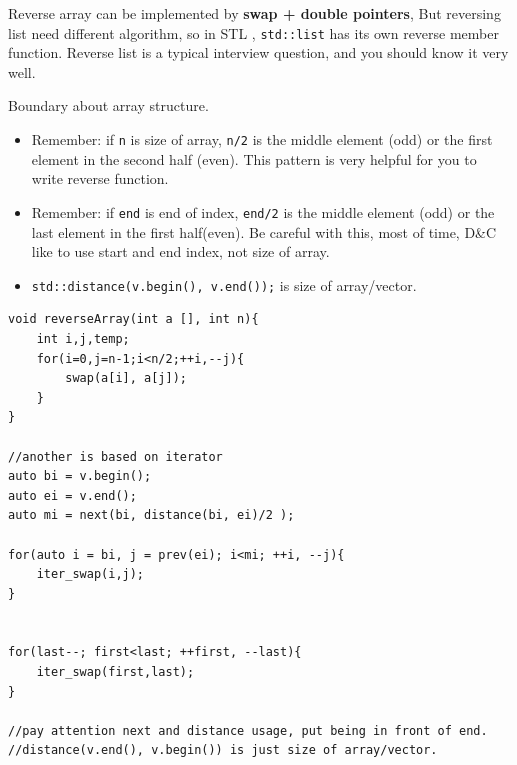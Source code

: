\documentclass[a4paper,11pt,twoside]{book}
\begin{document}
	
	\par  Reverse array can be implemented by \textbf{swap + double pointers}, But reversing list need different algorithm, so in STL , \texttt{std::list} has its own reverse member function. Reverse list is a typical interview question, and you should know it very well. 
	
	\par Boundary about array structure. 
	\begin{itemize}
		\item Remember: if \texttt{n} is size of array, \texttt{n/2} is the middle element (odd) or the first element in the second half (even). This pattern is very helpful for you to write reverse function. 
		
		\item Remember: if \texttt{end} is end of index, \texttt{end/2} is the middle element (odd) or the last element in the first half(even). Be careful with this, most of time, D\&C like to use start and end index, not size of array. 
		
		\item \texttt{std::distance(v.begin(), v.end());} is size of array/vector. 
	\end{itemize}
	
\begin{lstlisting}[breaklines]
void reverseArray(int a [], int n){
	int i,j,temp;
	for(i=0,j=n-1;i<n/2;++i,--j){
		swap(a[i], a[j]);
	}
}

//another is based on iterator
auto bi = v.begin();
auto ei = v.end();
auto mi = next(bi, distance(bi, ei)/2 );

for(auto i = bi, j = prev(ei); i<mi; ++i, --j){
	iter_swap(i,j);
}


for(last--; first<last; ++first, --last){
	iter_swap(first,last);
}

//pay attention next and distance usage, put being in front of end.
//distance(v.end(), v.begin()) is just size of array/vector. 
\end{lstlisting}
\end{document}
